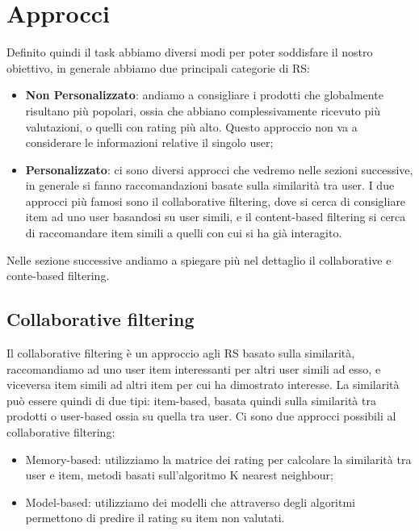 \section{Approcci}
Definito quindi il task abbiamo diversi modi per poter soddisfare il nostro obiettivo, in generale abbiamo due principali categorie di RS:
\begin{itemize}
	\item \textbf{Non Personalizzato}: andiamo a consigliare i prodotti che globalmente risultano più popolari, ossia che abbiano complessivamente ricevuto più valutazioni, o quelli con rating più alto. Questo approccio non va a considerare le informazioni relative il singolo user;
	\item \textbf{Personalizzato}: ci sono diversi approcci che vedremo nelle sezioni successive, in generale si fanno raccomandazioni basate sulla similarità tra user. I due approcci più famosi sono il collaborative filtering, dove si cerca di consigliare item ad uno user basandosi su user simili, e il content-based filtering si cerca di raccomandare item simili a quelli con cui si ha già interagito.
\end{itemize}

Nelle sezione successive andiamo a spiegare più nel dettaglio il collaborative e conte-based filtering.

\subsection{Collaborative filtering}
Il collaborative filtering è un approccio agli RS basato sulla similarità, raccomandiamo ad uno user item interessanti per altri user simili ad esso, e viceversa item simili ad altri item per cui ha dimostrato interesse.
La similarità può essere quindi di due tipi: item-based, basata quindi sulla similarità tra prodotti o user-based ossia su quella tra user.
Ci sono due approcci possibili al collaborative filtering:
\begin{itemize}
	\item Memory-based: utilizziamo la matrice dei rating per calcolare la similarità tra user e item, metodi basati sull'algoritmo K nearest neighbour;
	\item Model-based: utilizziamo dei modelli che attraverso degli algoritmi permettono di predire il rating su item non valutati.
\end{itemize}

